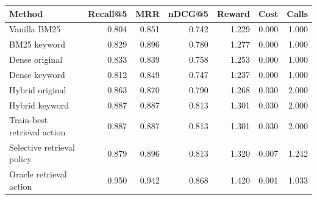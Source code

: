 \begin{tabular}{lrrrrrr}
\toprule
Method & Recall@5 & MRR & nDCG@5 & Reward & Cost & Calls \\
\midrule
Vanilla BM25 & 0.804 & 0.851 & 0.742 & 1.229 & 0.000 & 1.000 \\
BM25 keyword & 0.829 & 0.896 & 0.780 & 1.277 & 0.000 & 1.000 \\
Dense original & 0.833 & 0.839 & 0.758 & 1.253 & 0.000 & 1.000 \\
Dense keyword & 0.812 & 0.849 & 0.747 & 1.237 & 0.000 & 1.000 \\
Hybrid original & 0.863 & 0.870 & 0.790 & 1.268 & 0.030 & 2.000 \\
Hybrid keyword & 0.887 & 0.887 & 0.813 & 1.301 & 0.030 & 2.000 \\
Train-best retrieval action & 0.887 & 0.887 & 0.813 & 1.301 & 0.030 & 2.000 \\
Selective retrieval policy & 0.879 & 0.896 & 0.813 & 1.320 & 0.007 & 1.242 \\
Oracle retrieval action & 0.950 & 0.942 & 0.868 & 1.420 & 0.001 & 1.033 \\
\bottomrule
\end{tabular}
